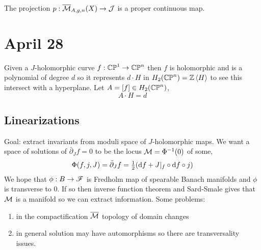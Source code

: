 \documentclass[12pt]{article}
\newcommand{\dbar}{\bar{\partial}}
\begin{document}
\begin{cor}
The projection $p : \overline{\mathcal{M}}_{A, g, n}(X) \to \mathcal{J}$ is a proper continuous map.
\end{cor}

\section{April 28}

Given a $J$-holomorphic curve $f : \mathbb{CP}^1 \to \mathbb{CP}^n$ then $f$ is holomorphic and is a polynomial of degree $d$ so it represents $d \cdot H$ in $H_2(\mathbb{CP}^n) = \mathbb{Z} \left< H \right>$ to see this intersect with a hyperplane. Let $A = [f] \in H_2(\mathbb{CP}^n)$,
\[ A \cdot H = d \]

\subsection{Linearizations}

Goal: extract invariants from moduli space of $J$-holomorphic maps. We want a space of solutions of $\dbar_J f = 0$ to be the locus $\mathcal{M} = \Phi^{-1}(0)$ of some,
\[ \Phi(f, j, J) = \dbar_J f = \tfrac{1}{2} (\d{f} + J |_f \circ \d{f} \circ j) \]
We hope that $\phi : B \to \mathscr{F}$ is Fredholm map of spearable Banach manifolds and $\phi$ is transverse to $0$. If so then inverse function theorem and Sard-Smale gives that $\mathcal{M}$ is a manifold so we can extract information. Some problems:

\newcommand{\bb}{\mathbb}

\begin{enumerate}
\item in the compactification $\overline{\mathcal{M}}$ topology of domain changes 
\item in general solution may have automorphisms so there are transversality issues. 
\end{enumerate}
\end{document}
